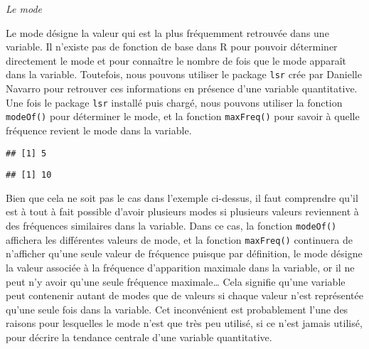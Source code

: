 \documentclass[
]{book}
\newenvironment{Shaded}{\begin{snugshade}}{\end{snugshade}}
\newcommand{\AttributeTok}[1]{\textcolor[rgb]{0.77,0.63,0.00}{#1}}
\newcommand{\CommentTok}[1]{\textcolor[rgb]{0.56,0.35,0.01}{\textit{#1}}}
\newcommand{\FunctionTok}[1]{\textcolor[rgb]{0.00,0.00,0.00}{#1}}
\newcommand{\NormalTok}[1]{#1}
\newcommand{\SpecialCharTok}[1]{\textcolor[rgb]{0.00,0.00,0.00}{#1}}
\begin{document}
\emph{Le mode}

Le mode désigne la valeur qui est la plus fréquemment retrouvée dans une variable. Il n'existe pas de fonction de base dans R pour pouvoir déterminer directement le mode et pour connaître le nombre de fois que le mode apparaît dans la variable. Toutefois, nous pouvons utiliser le package \texttt{lsr} crée par Danielle Navarro \autocite*{navarroLearningStatistics2018} pour retrouver ces informations en présence d'une variable quantitative. Une fois le package \texttt{lsr} installé puis chargé, nous pouvons utiliser la fonction \texttt{modeOf()} pour déterminer le mode, et la fonction \texttt{maxFreq()} pour savoir à quelle fréquence revient le mode dans la variable.

\begin{Shaded}
\end{Shaded}

\begin{verbatim}
## [1] 5
\end{verbatim}

\begin{Shaded}
\end{Shaded}

\begin{verbatim}
## [1] 10
\end{verbatim}

Bien que cela ne soit pas le cas dans l'exemple ci-dessus, il faut comprendre qu'il est à tout à fait possible d'avoir plusieurs modes si plusieurs valeurs reviennent à des fréquences similaires dans la variable. Dans ce cas, la fonction \texttt{modeOf()} affichera les différentes valeurs de mode, et la fonction \texttt{maxFreq()} continuera de n'afficher qu'une seule valeur de fréquence puisque par définition, le mode désigne la valeur associée à la fréquence d'apparition maximale dans la variable, or il ne peut n'y avoir qu'une seule fréquence maximale\ldots{} Cela signifie qu'une variable peut contenenir autant de modes que de valeurs si chaque valeur n'est représentée qu'une seule fois dans la variable. Cet inconvénient est probablement l'une des raisons pour lesquelles le mode n'est que très peu utilisé, si ce n'est jamais utilisé, pour décrire la tendance centrale d'une variable quantitative.
\end{document}
